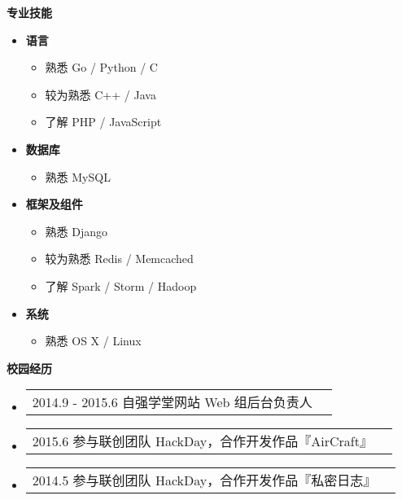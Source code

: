 \documentclass[a4paper,9pt]{article}
\makeatletter
\newcommand{\resheading}[1]{{\large \colorbox{mygrey}{\begin{minipage}{\textwidth}{\textbf{#1 \vphantom{p\^{E}}}}\end{minipage}}}}
\newcommand{\ressubheading}[2]{
  \begin{tabular*}{172mm}{l@{\extracolsep{\fill}}r}
    \textbf{#1} & #2
  \end{tabular*}\vspace{0pt}}
\newcommand{\ressubnormal}[2]{
  \begin{tabular*}{172mm}{l@{\extracolsep{\fill}}r}
    \textnormal{#1} & #2
  \end{tabular*}\vspace{0pt}}
\makeatother
\begin{document}
\begin{itemize}

  
\end{itemize}

\resheading{专业技能}
\begin{multicols}{2}
  \begin{itemize}
  \item
    \textbf{语言}
    \begin{itemize}
    \item{熟悉 Go / Python / C}
    \item{较为熟悉 C++ / Java}
    \item{了解 PHP / JavaScript}
    \end{itemize}
  \item
    \textbf{数据库}
    \begin{itemize}
    \item{熟悉 MySQL}
    \end{itemize}
  \item
    \textbf{框架及组件}
    \begin{itemize}
    \item{熟悉 Django}
    \item{较为熟悉 Redis / Memcached}
    \item{了解 Spark / Storm / Hadoop}
    \end{itemize}
  \item
    \textbf{系统}
    \begin{itemize}
    \item{熟悉 OS X / Linux}
    \end{itemize}
  \end{itemize}
\end{multicols}

\resheading{校园经历}

\begin{itemize}
\item \ressubnormal{2014.9 - 2015.6 自强学堂网站 Web 组后台负责人}{}
\item \ressubnormal{2015.6 参与联创团队 HackDay，合作开发作品『AirCraft』 \color{link}{https://github.com/doraemonext/aircraft-server/}}{}
\item \ressubnormal{2014.5 参与联创团队 HackDay，合作开发作品『私密日志』 \color{link}{https://github.com/doraemonext/hackday/}}{}
\end{itemize}
\end{document}
